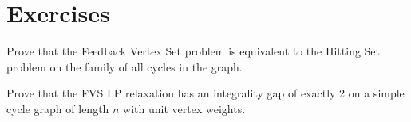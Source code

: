 \section{Exercises}
\begin{exercise}
Prove that the Feedback Vertex Set problem is equivalent to the Hitting Set problem on the family of all cycles in the graph.
\end{exercise}
\begin{exercise}
Prove that the FVS LP relaxation has an integrality gap of exactly 2 on a simple cycle graph of length $n$ with unit vertex weights.
\end{exercise}

